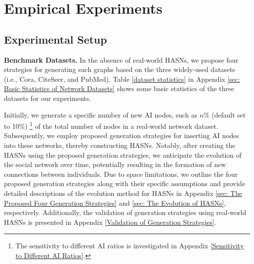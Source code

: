 \section{Empirical Experiments}
\label{sec:experiments}
\subsection{Experimental Setup}
\label{subsec:experimental_setup}

\noindent\textbf{Benchmark Datasets.} In the absence of real-world HASNs, we propose four strategies for generating such graphs based on the three widely-used datasets (i.e., Cora, CiteSeer, and PubMed). Table \ref{dataset statistics} in Appendix \ref{sec: Basic Statistics of Network Datasets} shows some basic statistics of the three datasets for our experiments.

Initially, we generate a specific number of new AI nodes, such as $n\%$ 
(default set to 10\%) \footnote{The sensitivity to different AI ratios is investigated in Appendix \ref{Sensitivity to Different AI Ratios}.} of the total number of nodes in a real-world network dataset. Subsequently, we employ proposed generation strategies for inserting AI nodes into these networks, thereby constructing HASNs. Notably, after creating the HASNs using the proposed generation strategies, we anticipate the evolution of the social network over time, potentially resulting in the formation of new connections between individuals. Due to space limitations, we outline the four proposed generation strategies along with their specific assumptions \cite{nomiAI2024}\cite{zhang2024better}\cite{skjuve2021my}\cite{loveys2019reducing} and provide detailed descriptions of the evolution method for HASNs in Appendix \ref{sec: The Proposed Four Generation Strategies} and \ref{sec: The Evolution of HASNs}, respectively. Additionally, the validation of generation strategies using real-world HASNs is presented in Appendix \ref{Validation of Generation Strategies}.

